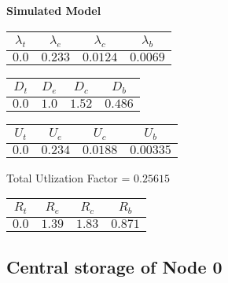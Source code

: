 \documentclass{article}
\begin{document}
\begin{minipage}{0.5\textwidth}
\centering	\textbf{Simulated Model}
\begin{table}[H]
\centering
\begin{tabular}{@{}cccc@{}}
\toprule
$\lambda_t$ & $\lambda_e$ & $\lambda_c$ & $\lambda_b$\\
\midrule
$0.0$ & $0.233$ & $0.0124$ & $0.0069$\\
\bottomrule
\end{tabular}
\end{table}
\begin{table}[H]
\centering
\begin{tabular}{@{}cccc@{}}
\toprule
$D_t$ & $D_e$ & $D_c$ & $D_b$\\
\midrule
$0.0$ & $1.0$ & $1.52$ & $0.486$\\
\bottomrule
\end{tabular}
\end{table}\begin{table}[H]
\centering
\begin{tabular}{@{}cccc@{}}
\toprule
$U_t$ & $U_e$ & $U_c$ & $U_b$\\
\midrule
$0.0$ & $0.234$ & $0.0188$ & $0.00335$\\
\bottomrule
\end{tabular}
\end{table}
\centering Total Utlization Factor = $0.25615$
\begin{table}[H]
\centering
\begin{tabular}{@{}cccc@{}}
\toprule
$R_t$ & $R_e$ & $R_c$ & $R_b$\\
\midrule
$0.0$ & $1.39$ & $1.83$ & $0.871$\\
\bottomrule
\end{tabular}
\end{table}
\end{minipage}\subsection{Central storage of Node 0}
\end{document}

